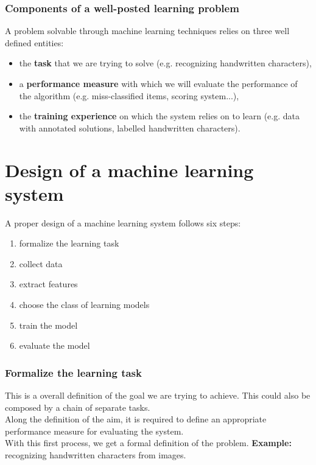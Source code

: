 \subsubsection*{Components of a well-posted learning problem}
A problem solvable through machine learning techniques relies on three well
defined entities:
\begin{itemize}
	\item the \textbf{task} that we are trying to solve (e.g. recognizing
		handwritten characters),

	\item a \textbf{performance measure} with which we will evaluate the
		performance of the algorithm (e.g. miss-classified items, scoring system...),

	\item the \textbf{training experience} on which the system relies on to learn
		(e.g. data with annotated solutions, labelled handwritten characters).
\end{itemize}

\section{Design of a machine learning system}
A proper design of a machine learning system follows six steps:
\begin{enumerate}
	\item formalize the learning task

	\item collect data

	\item extract features

	\item choose the class of learning models

	\item train the model

	\item evaluate the model
\end{enumerate}

\subsubsection*{Formalize the learning task}
This is a overall definition of the goal we are trying to achieve. This could also
be composed by a chain of separate tasks.\\ Along the definition of the aim, it
is required to define an appropriate performance measure for evaluating the
system.\\ With this first process, we get a formal definition of the problem.
\newline
\textbf{Example:} recognizing handwritten characters from images.

